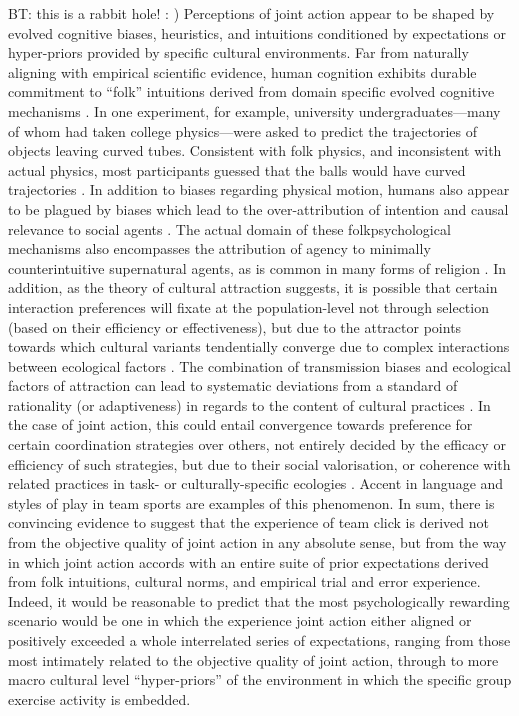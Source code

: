 \begin{CJK}{UTF8}{gbsn}
BT: this is a rabbit hole! : )
Perceptions of joint action appear to be shaped by evolved cognitive biases, heuristics, and intuitions conditioned by expectations or hyper-priors provided by specific cultural environments.  Far from naturally aligning with empirical scientific evidence, human cognition exhibits durable commitment to ``folk'' intuitions derived from domain specific evolved cognitive mechanisms \citep{Bloom2007}.  In one experiment, for example, university undergraduates–--many of whom had taken college physics---were asked to predict the trajectories of objects leaving curved tubes. Consistent with folk physics, and inconsistent with actual physics, most participants guessed that the balls would have curved trajectories \citep{McCloskey1980}.
In addition to biases regarding physical motion, humans also appear to be plagued by biases which lead to the over-attribution of intention and causal relevance to social agents \citep{Atran2004}.  The actual domain of these folkpsychological mechanisms also encompasses the attribution of agency to minimally counterintuitive supernatural agents, as is common in many forms of religion \citep{Boyer2001}.
In addition, as the theory of cultural attraction suggests, it is possible that certain interaction preferences will fixate at the population-level not through selection (based on their efficiency or effectiveness), but due to the attractor points towards which cultural variants tendentially converge due to complex interactions between ecological factors \citep{Sperber1996,Mesoudi2017}. The combination of transmission biases and ecological factors of attraction can lead to systematic deviations from a standard of rationality (or adaptiveness) in regards to the content of cultural practices \citep{Kahneman2003}.  In the case of joint action, this could entail convergence towards preference for certain coordination strategies over others, not entirely decided by the efficacy or efficiency of such strategies, but due to their social valorisation, or coherence with related practices in task- or culturally-specific ecologies \citep{Claidiere2014}.  Accent in language and styles of play in team sports are examples of this phenomenon.  In sum, there is convincing evidence to suggest that the experience of team click is derived not from the objective quality of joint action in any absolute sense, but from the way in which joint action accords with an entire suite of prior expectations derived from folk intuitions, cultural norms, and empirical trial and error experience.  Indeed, it would be reasonable to predict that the most psychologically rewarding scenario would be one in which the experience joint action either aligned or positively exceeded a whole interrelated series of expectations, ranging from those most intimately related to the objective quality of joint action, through to more macro cultural level ``hyper-priors'' of the environment in which the specific group exercise activity is embedded.


\end{CJK}
